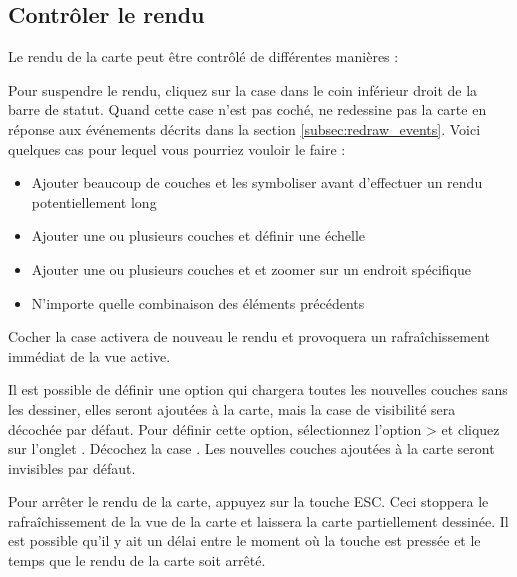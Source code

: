 \subsection{Contrôler le rendu}\label{label_controlmap}

Le rendu de la carte peut être contrôlé de différentes manières :

\label{label_suspendrender}

Pour suspendre le rendu, cliquez sur la case dans le coin inférieur droit de la barre de statut. Quand cette case n'est pas coché, \qg ne redessine pas la carte en réponse aux événements décrits dans la section \ref{subsec:redraw_events}. Voici quelques cas pour lequel vous pourriez vouloir le faire :

\begin{itemize}[label=--]
\item Ajouter beaucoup de couches et les symboliser avant d'effectuer un rendu potentiellement long
\item Ajouter une ou plusieurs couches et définir une échelle
\item Ajouter une ou plusieurs couches et et zoomer sur un endroit spécifique
\item N'importe quelle combinaison des éléments précédents
\end{itemize}

Cocher la case  activera de nouveau le rendu et provoquera un rafraîchissement immédiat de la vue active.

\label{label_settinglayer}

Il est possible de définir une option qui chargera toutes les nouvelles couches sans les dessiner, elles seront ajoutées à la carte, mais la case de visibilité sera décochée par défaut. Pour définir cette option, sélectionnez l'option  >  et cliquez sur l'onglet . Décochez la case . Les nouvelles couches ajoutées à la carte seront invisibles par défaut.

\label{label_stoprender}

Pour arrêter le rendu de la carte, appuyez sur la touche ESC. Ceci stoppera le rafraîchissement de la vue de la carte et laissera la carte partiellement dessinée. Il est possible qu'il y ait un délai entre le moment où la touche est pressée et le temps que le rendu de la carte soit arrêté.

